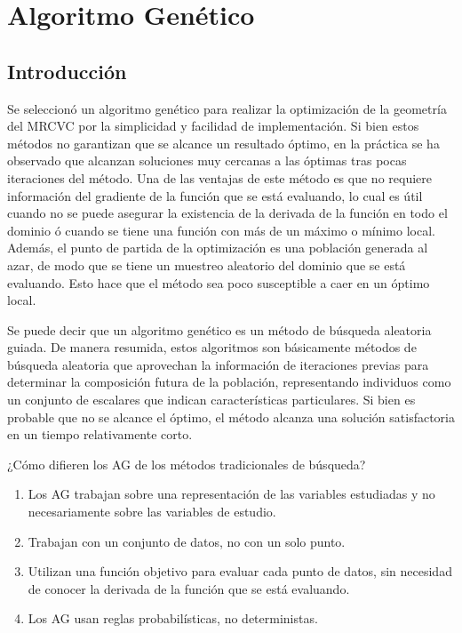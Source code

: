 \chapter{Algoritmo Genético}

\section{Introducción}
Se seleccionó un algoritmo genético para realizar la optimización de la
geometría del MRCVC por la simplicidad y facilidad de implementación.
%
Si bien estos métodos no garantizan que se alcance un resultado óptimo, en la
práctica\cite{goldberg}\cite{shi} se ha observado que alcanzan soluciones muy
cercanas a las óptimas tras pocas iteraciones del método.
%
Una de las ventajas de este método es que no requiere información del gradiente
de la función que se está evaluando, lo cual es útil cuando no se puede asegurar
la existencia de la derivada de la función en todo el dominio ó cuando se tiene
una función con más de un máximo o mínimo local.
%
Además, el punto de partida de la optimización es una población generada al
azar, de modo que se tiene un muestreo aleatorio del dominio que se está
evaluando.
%
Esto hace que el método sea poco susceptible a caer en un óptimo local.



Se puede decir que un algoritmo genético es un método de búsqueda aleatoria guiada.
%
De manera resumida, estos algoritmos son básicamente métodos de búsqueda
aleatoria que aprovechan la información de iteraciones previas para determinar
la composición futura de la población, representando individuos como un conjunto
de escalares que indican características particulares.
%
Si bien es probable que no se alcance el óptimo, el método alcanza una solución satisfactoria en un tiempo relativamente corto.

¿Cómo difieren los AG de los métodos tradicionales de búsqueda?
%
\begin{enumerate}
  \item Los AG trabajan sobre una representación de las variables estudiadas y no necesariamente sobre las variables de estudio.
    \item Trabajan con un conjunto de datos, no con un solo punto.
    \item Utilizan una función objetivo para evaluar cada punto de datos, sin necesidad de conocer la derivada de la función que se está evaluando.
    \item Los AG usan reglas probabilísticas, no deterministas.
\end{enumerate}

